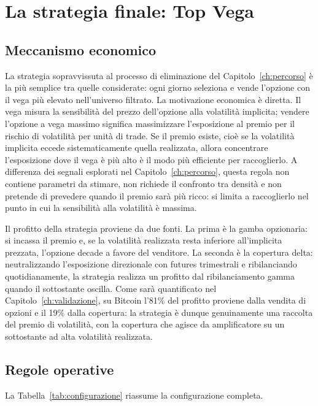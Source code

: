 \chapter{La strategia finale: Top Vega}
\label{ch:strategia}

\section{Meccanismo economico}
\label{sec:strategia-meccanismo}

La strategia sopravvissuta al processo di eliminazione del
Capitolo~\ref{ch:percorso} è la più semplice tra quelle considerate: ogni
giorno seleziona e vende l'opzione con il vega più elevato nell'universo
filtrato. La motivazione economica è diretta. Il vega misura la sensibilità
del prezzo dell'opzione alla volatilità implicita; vendere l'opzione a vega
massimo significa massimizzare l'esposizione al premio per il rischio di
volatilità per unità di trade. Se il premio esiste, cioè se la volatilità
implicita eccede sistematicamente quella realizzata, allora concentrare
l'esposizione dove il vega è più alto è il modo più efficiente per
raccoglierlo. A differenza dei segnali esplorati nel
Capitolo~\ref{ch:percorso}, questa regola non contiene parametri da
stimare, non richiede il confronto tra densità e non pretende di prevedere
quando il premio sarà più ricco: si limita a raccoglierlo nel punto in cui
la sensibilità alla volatilità è massima.

Il profitto della strategia proviene da due fonti. La prima è la gamba
opzionaria: si incassa il premio e, se la volatilità realizzata resta
inferiore all'implicita prezzata, l'opzione decade a favore del venditore.
La seconda è la copertura delta: neutralizzando l'esposizione direzionale
con futures trimestrali e ribilanciando quotidianamente, la strategia
realizza un profitto dal ribilanciamento gamma quando il sottostante oscilla.
Come sarà quantificato nel Capitolo~\ref{ch:validazione}, su Bitcoin
l'81\% del profitto proviene dalla vendita di opzioni e il 19\% dalla
copertura: la strategia è dunque genuinamente una raccolta del premio di
volatilità, con la copertura che agisce da amplificatore su un sottostante
ad alta volatilità realizzata.

\section{Regole operative}
\label{sec:strategia-regole}

La Tabella~\ref{tab:configurazione} riassume la configurazione completa.

